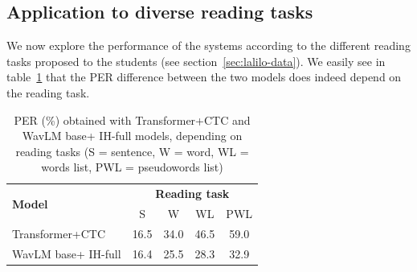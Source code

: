 \documentclass{Interspeech2024}
\begin{document}

\vspace{-0.2cm}
\subsection{Application to diverse reading tasks}

We now explore the performance of the systems according to the different reading tasks proposed to the students (see section~\ref{sec:lalilo-data}). We easily see in table~\ref{tab:reading-tasks} that the PER difference between the two models does indeed depend on the reading task.

\vspace{-0.1cm}
\begin{table}[!htb]
    \centering
        \caption{PER (\%) obtained with Transformer+CTC and WavLM base+ IH-full models, depending on reading tasks (S = sentence, W = word, WL = words list, PWL = pseudowords list)}
	\begin{tabular}{|l|c c c c|}
    \hline
	\multirow{2}{*}{\textbf{Model}} & \multicolumn{4}{c|}{\textbf{Reading task}} \\
    & S & W & WL & PWL  \\
    \hline
    Transformer+CTC & 16.5 & 34.0 & 46.5 & 59.0  \\
    WavLM base+ IH-full & 16.4 & 25.5 & 28.3 & 32.9 \\
    \hline
	\end{tabular}
    \label{tab:reading-tasks}
\end{table}
\end{document}
